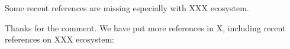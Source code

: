 \documentclass{ar2rc}
\begin{document}
\begin{RC}
    Some recent references are missing especially with XXX ecosystem.
\end{RC}

\begin{AR}
    Thanks for the comment.
    We have put more references in X, 
    including recent references on XXX ecosystem:
\end{AR}


\gliMarker %






\end{document}
